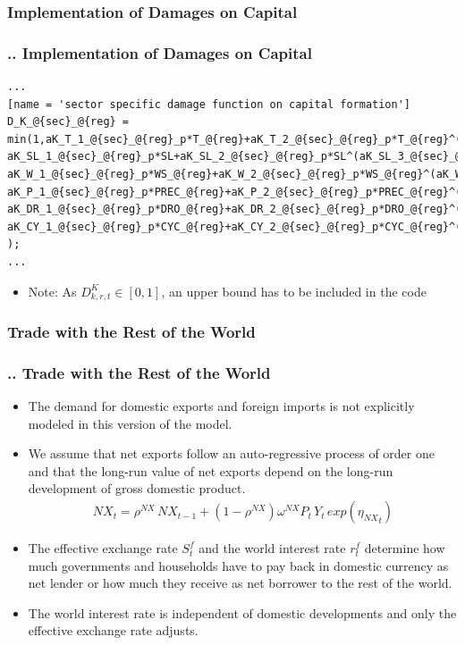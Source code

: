 \documentclass[11pt,aspectratio=169]{beamer}
\begin{document}
\subsubsection{Implementation of Damages on Capital}
\begin{frame}[fragile]
\frametitle{{\thesection.\thesubsection.\thesubsubsection} Implementation of Damages on Capital}

\begin{lstlisting}[frame = single]
...
[name = 'sector specific damage function on capital formation']
D_K_@{sec}_@{reg} = min(1,aK_T_1_@{sec}_@{reg}_p*T_@{reg}+aK_T_2_@{sec}_@{reg}_p*T_@{reg}^(aK_T_3_@{sec}_@{reg}_p)+ 
aK_SL_1_@{sec}_@{reg}_p*SL+aK_SL_2_@{sec}_@{reg}_p*SL^(aK_SL_3_@{sec}_@{reg}_p)+
aK_W_1_@{sec}_@{reg}_p*WS_@{reg}+aK_W_2_@{sec}_@{reg}_p*WS_@{reg}^(aK_W_3_@{sec}_@{reg}_p)+
aK_P_1_@{sec}_@{reg}_p*PREC_@{reg}+aK_P_2_@{sec}_@{reg}_p*PREC_@{reg}^(aK_P_3_@{sec}_@{reg}_p)+
aK_DR_1_@{sec}_@{reg}_p*DRO_@{reg}+aK_DR_2_@{sec}_@{reg}_p*DRO_@{reg}^(aK_DR_3_@{sec}_@{reg}_p)+
aK_CY_1_@{sec}_@{reg}_p*CYC_@{reg}+aK_CY_2_@{sec}_@{reg}_p*CYC_@{reg}^(aK_CY_3_@{sec}_@{reg}_p)
);
...
\end{lstlisting}
\begin{itemize}
	\item Note: As $D_{k,r,t}^K \in [0,1]$, an upper bound has to be included in the code
\end{itemize}
\end{frame}




\subsubsection{Trade with the Rest of the World}
\begin{frame}
\frametitle{{\thesection.\thesubsection.\thesubsubsection} Trade with the Rest of the World}
\scriptsize
\begin{itemize}
\item The demand for domestic exports and foreign imports is not explicitly modeled in this version of the model. 
\item We assume that net exports follow an auto-regressive process of order one and that the long-run value of net exports depend on the long-run development of gross domestic product.
\begin{align*}
NX_{t} = \rho^{NX} \, NX_{t-1} + (1 - \rho^{NX}) \omega^{NX} P_{t} \, Y_{t} \, exp\left({{\eta_{NX}}_{t}}\right)
\end{align*}
\item The effective exchange rate $S^f_{t}$ and the world interest rate $r^{f}_{t}$ determine how much governments and households have to pay back in domestic currency as net lender or how much they receive as net borrower to the rest of the world.
 \item The world interest rate is independent of domestic developments and only the effective exchange rate adjusts.
\end{itemize}
\end{frame}
\end{document}
